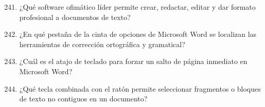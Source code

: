 \documentclass[10pt,a4paper]{article}
\begin{document}
\begin{enumerate}[label=\textbf{\arabic*.}]
\setcounter{enumi}{240}
\item ¿Qué software ofimático líder permite crear, redactar, editar y dar formato profesional a documentos de texto?
\begin{enumerate}[label=\textbf{\Alph*)}]
\end{enumerate}
\vspace{0.15cm}
\item ¿En qué pestaña de la cinta de opciones de Microsoft Word se localizan las herramientas de corrección ortográfica y gramatical?
\begin{enumerate}[label=\textbf{\Alph*)}]
\end{enumerate}
\vspace{0.15cm}
\item ¿Cuál es el atajo de teclado para forzar un salto de página inmediato en Microsoft Word?
\begin{enumerate}[label=\textbf{\Alph*)}]
\end{enumerate}
\vspace{0.15cm}
\item ¿Qué tecla combinada con el ratón permite seleccionar fragmentos o bloques de texto no contiguos en un documento?
\begin{enumerate}[label=\textbf{\Alph*)}]
\end{enumerate}
\end{enumerate}
\end{document}
